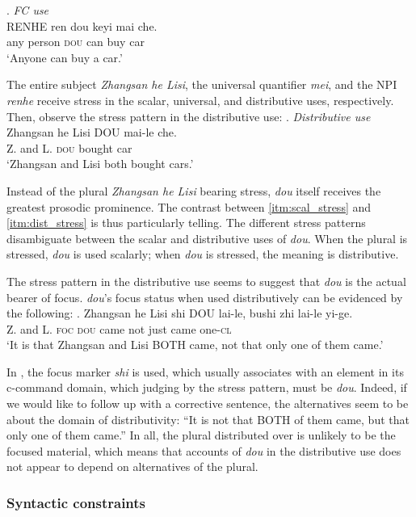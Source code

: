 \documentclass[12pt]{article}
\begin{document}
\ex. \emph{FC use}\\
\gll
RENHE ren dou keyi mai che. \\
any person \textsc{dou} can buy car \\
\glt `Anyone can buy a car.'

The entire subject \emph{Zhangsan he Lisi}, the universal quantifier \emph{mei}, and the NPI \emph{renhe} receive stress in the scalar, universal, and distributive uses, respectively.
Then, observe the stress pattern in the distributive use:
\ex. \emph{Distributive use}\\
\gll
Zhangsan he Lisi DOU mai-le che. \\
Z. and L. \textsc{dou} bought car \\
\glt `Zhangsan and Lisi both bought cars.' \label{itm:dist_stress}

Instead of the plural \emph{Zhangsan he Lisi} bearing stress, \emph{dou} itself receives the greatest prosodic prominence.
The contrast between \cref{itm:scal_stress} and \cref{itm:dist_stress} is thus particularly telling.
The different stress patterns disambiguate between the scalar and distributive uses of \emph{dou}.
When the plural is stressed, \emph{dou} is used scalarly; when \emph{dou} is stressed, the meaning is distributive.

The stress pattern in the distributive use seems to suggest that \emph{dou} is the actual bearer of focus.
\emph{dou}'s focus status when used distributively can be evidenced by the following:
\ex. \gll
Zhangsan he Lisi shi DOU lai-le, bushi zhi lai-le yi-ge. \\
Z. and L. \textsc{foc} \textsc{dou} came not just came one-\textsc{cl} \\
\glt `It is that Zhangsan and Lisi BOTH came, not that only one of them came.'

In \Last, the focus marker \emph{shi} is used, which usually associates with an element in its c-command domain, which judging by the stress pattern, must be \emph{dou}.
Indeed, if we would like to follow up with a corrective sentence, the alternatives seem to be about the domain of distributivity: ``It is not that BOTH of them came, but that only one of them came.''
In all, the plural distributed over is unlikely to be the focused material, which means that accounts of \emph{dou} in the distributive use does not appear to depend on alternatives of the plural.



\subsubsection{Syntactic constraints}
\label{ssub:syntactic_constraints}
\end{document}
